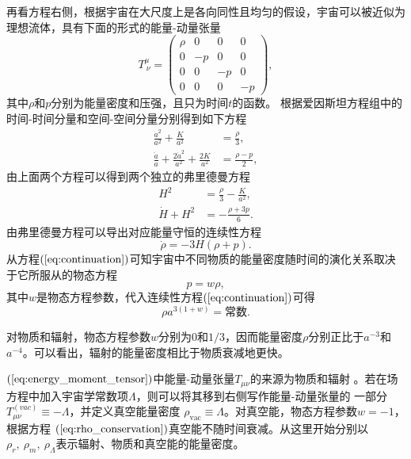 再看方程右侧，根据宇宙在大尺度上是各向同性且均匀的假设，宇宙可以被近似为理想流体，具有下面的形式的能量-动量张量
\begin{equation}
    \label{eq:energy_moment_tensor}
    T^{\mu}_{\ \nu} =
    \begin{pmatrix}
        \rho & 0 & 0 & 0 \\
        0 & -p & 0 & 0 \\
        0 & 0 & -p & 0 \\
        0 & 0 & 0 & -p
    \end{pmatrix},
\end{equation}
其中$\rho$和$p$分别为能量密度和压强，且只为时间$t$的函数。
根据爱因斯坦方程组中的时间-时间分量和空间-空间分量分别得到如下方程
\begin{align}
    \label{eq:00_einstein} 
    \frac{\dot{a}^2}{a^2} + \frac{K}{a^2} &= \frac{\rho}{3} , \\
    \label{eq:ij_einstein}
    \frac{\ddot{a}}{a}+\frac{2\dot{a}^2}{a^2}+\frac{2K}{a^2}&=
    \frac{\rho-p}{2},
\end{align}
由上面两个方程可以得到两个独立的弗里德曼方程
\begin{align}
    \label{eq:1st_friedmann_equation}
    H^2 &= \frac{\rho}{3}-
    \frac{K}{a^2}, \\
    \label{eq:accelaration_equation}
    \dot{H} + H^2 &= -\frac{\rho+3p}{6}.
\end{align}
由弗里德曼方程可以导出对应能量守恒的连续性方程
\begin{equation}\label{eq:continuation}
    \dot{\rho}=-3H\left(\rho+p\right).
\end{equation}
从方程$(\ref{eq:continuation})$可知宇宙中不同物质的能量密度随时间的演化关系取决于它所服从的物态方程
\begin{equation}
    \label{eq:state_equation}
    p=w\rho,
\end{equation}
其中$w$是物态方程参数，代入连续性方程$(\ref{eq:continuation})$可得
\begin{equation}
    \label{eq:rho_conservation}
    \rho a^{3(1+w)} =\text{常数}.
\end{equation}

对物质和辐射，物态方程参数$w$分别为$0$和$1/3$，因而能量密度$\rho$分别正比于$a^{-3}$和$a^{-4}$。可以看出，辐射的能量密度相比于物质衰减地更快。

$(\ref{eq:energy_moment_tensor})$中能量-动量张量$T_{\mu\nu}$的来源为物质和辐射
。若在场方程中加入宇宙学常数项$\Lambda$，则可以将其移到右侧写作能量-动量张量的
一部分$T^{(vac)}_{\mu\nu}\equiv-\Lambda$，并定义真空能量密度
$\rho_{\text{vac}}\equiv\Lambda$。对真空能，物态方程参数$w=-1$，根据方程
$(\ref{eq:rho_conservation})$真空能不随时间衰减。从这里开始分别以$\rho_r,\
\rho_m,\ \rho_{\Lambda}$表示辐射、物质和真空能的能量密度。

